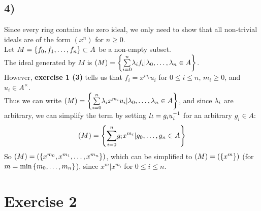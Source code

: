 \documentclass[a4paper]{scrartcl}
\begin{document}
\subsection*{4)}
Since every ring contains the zero ideal, we only need to show that all non-trivial ideals are of the form $(x^n)$ for $n\geq0$.\\
Let $M=\left\lbrace f_0,f_1,\dots,f_n \right\rbrace\subset A$ be a non-empty subset.\\
The ideal generated by $M$ is $(M)=\left\lbrace \underset{i=0}{\overset{n}{\sum}}\lambda_if_i|\lambda_0,\dots,\lambda_n\in A \right\rbrace$.\\
However, \textbf{exercise 1 (3)} tells us that $f_i=x^{m_i}u_i$ for $0\leq i\leq n$, $m_i\geq0$, and $u_i\in A^\times$.\\
Thus we can write $(M)=\left\lbrace \underset{i=0}{\overset{n}{\sum}}\lambda_ix^{m_i}u_i|\lambda_0,\dots,\lambda_n\in A \right\rbrace$, and since $\lambda_i$ are arbitrary, we can simplify the term by setting $l\iota=g_iu_i^{-1}$ for an arbitrary $g_i\in A$:
\[(M)=\left\lbrace \underset{i=0}{\overset{n}{\sum}}g_ix^{m_i}|g_0,\dots,g_n\in A \right\rbrace\]
So $(M)=(\left\lbrace x^{m_0},x^{m_1},\dots,x^{m_n} \right\rbrace)$, which can be simplified to $(M)=(\left\lbrace x^m \right\rbrace)$ (for $m=\min\bc{m_0,\dots,m_n}$), since $x^m|x^{m_i}$ for $0\leq i\leq n$.
\section*{Exercise 2}
\end{document}
